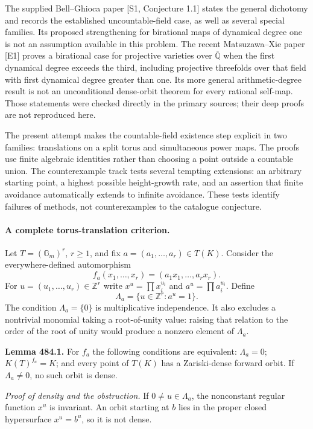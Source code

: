 \documentclass[11pt]{article}
\begin{document}
The supplied Bell--Ghioca paper [S1, Conjecture 1.1] states the general
dichotomy and records the established uncountable-field case, as well as
several special families. Its proposed strengthening for birational maps
of dynamical degree one is not an assumption available in this problem.
The recent Matsuzawa--Xie paper [E1] proves a birational case for projective
varieties over $\overline{\mathbb Q}$ when the first dynamical degree
exceeds the third, including projective threefolds over that field with first
dynamical degree greater than one. Its more general arithmetic-degree
result is not an unconditional dense-orbit theorem for every rational
self-map. Those statements were checked directly in the primary sources;
their deep proofs are not reproduced here.

The present attempt makes the countable-field existence step explicit in
two families: translations on a split torus and simultaneous power maps.
The proofs use finite algebraic identities rather than choosing a point
outside a countable union. The counterexample track tests several tempting
extensions: an arbitrary starting point, a highest possible height-growth
rate, and an assertion that finite avoidance automatically extends to
infinite avoidance. These tests identify failures of methods, not
counterexamples to the catalogue conjecture.

\paragraph{A complete torus-translation criterion.}
Let $T=(\mathbb G_m)^r$, $r\ge1$, and fix
$a=(a_1,\ldots,a_r)\in T(K)$. Consider the everywhere-defined automorphism
\[
 f_a(x_1,\ldots,x_r)=(a_1x_1,\ldots,a_rx_r).
\]
For $u=(u_1,\ldots,u_r)\in\mathbb Z^r$ write
$x^u=\prod x_i^{u_i}$ and $a^u=\prod a_i^{u_i}$. Define
\[
 \Lambda_a=\{u\in\mathbb Z^r:a^u=1\}.
\]
The condition $\Lambda_a=\{0\}$ is multiplicative independence. It also
excludes a nontrivial monomial taking a root-of-unity value: raising that
relation to the order of the root of unity would produce a nonzero
element of $\Lambda_a$.

\textbf{Lemma 484.1.}
For $f_a$ the following conditions are equivalent: $\Lambda_a=0$;
$K(T)^{f_a}=K$; and every point of $T(K)$ has a Zariski-dense forward
orbit. If $\Lambda_a\ne0$, no such orbit is dense.

\emph{Proof of density and the obstruction.}
If $0\ne u\in\Lambda_a$, the nonconstant regular function $x^u$ is
invariant. An orbit starting at $b$ lies in the proper closed hypersurface
$x^u=b^u$, so it is not dense.
\end{document}
